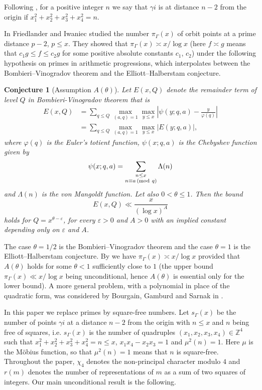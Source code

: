 \documentclass[12pt]{amsart}
\newtheorem{conjecture}{Conjecture}
\theoremstyle{remark}
\newcommand{\Z}{\mathbb{Z}}
\renewcommand{\pmod}[1]{\mkern3mu(\mathrm{mod}\ #1)}
\begin{document}
Following \cite{MR2486486}, for a positive integer $n$ we say that $\gamma i$ is at distance $n-2$ from the origin if $x_1^2+x_2^2+x_3^2+x_4^2=n$.

In \cite{MR2486486} Friedlander and Iwaniec studied the number $\pi_\Gamma(x)$ of orbit points at a prime distance $p-2$, $p\le x$. 
They showed that $\pi_\Gamma(x)\asymp x/\log x$ (here $f\asymp g$ means that $c_1 g \le f \le c_2 g$ for some positive absolute constants $c_1$, $c_2$) under the following hypothesis on primes in arithmetic progressions, which interpolates between the Bombieri--Vinogradov theorem and the Elliott--Halberstam conjecture. 


\begin{conjecture}[Assumption $A(\theta)$]
    \label{conj}
    Let $E(x,Q)$ denote the remainder term of level $Q$ in Bombieri-Vinogradov theorem that is
	\[
        \begin{split}
            E(x, Q) &= \sum_{q \leq Q} \max_{(a,q)=1} \max_{y \leq x} \left|\psi(y;q,a)-\frac{y}{\varphi(q)}\right| \\
            &=  \sum_{q \leq Q} \max_{(a,q)=1} \max_{y \leq x} |E(y;q,a)|,
        \end{split}
	\]
	where $\varphi(q)$ is the Euler's totient function, $\psi(x;q,a)$ is the Chebyshev function given by
	\[
	    \psi(x;q,a) = \sum_{\substack{n \leq x \\ n \equiv a \pmod q}} \Lambda(n)
	\]
    and $\Lambda(n)$ is the von Mangoldt function. 
    Let also $0 < \theta \leq 1$. 
    Then the bound
    \begin{equation} \tag{$A(\theta)$}
        E(x,Q) \ll \frac{x}{(\log x)^A}
    \end{equation}
    holds for $Q=x^{\theta-\varepsilon}$, for every $\varepsilon >0$ and $A>0$ with an implied constant depending only on $\varepsilon$ and $A$.
\end{conjecture}

The case $\theta=1/2$ is the Bombieri--Vinogradov theorem and the case $\theta=1$ is the Elliott--Halberstam conjecture. 
By \cite{MR2486486} we have $\pi_\Gamma(x)\asymp x/\log x$ provided that $A(\theta)$ holds for some $\theta < 1$ sufficiently close to $1$ (the upper bound $\pi_\Gamma(x)\ll x/\log x$ being unconditional, hence $A(\theta)$ is essential only for the lower bound). 
A more general problem, with a polynomial in place of the quadratic form, was considered by Bourgain, Gamburd and Sarnak in \cite{MR2246331}.

In this paper we replace primes by square-free numbers. 
Let $s_\Gamma(x)$ be the number of points $\gamma i$ at a distance $n-2$ from the origin with $n \leq x$ and $n$ being free of squares, i.e. $s_{\Gamma}(x)$ is the number of quadruples $(x_1,x_2,x_3,x_4) \in \Z^4$ such that $x_1^2+x_2^2+x_3^2+x_4^2 = n \leq x$, $x_1x_4-x_2x_3=1$ and $\mu^2(n)=1$.
Here $\mu$ is the M\"obius function, so that $\mu^2(n)=1$ means that $n$ is square-free. Throughout the paper, $\chi_4$ denotes the non-principal character modulo $4$ and $r(m)$ denotes the number of representations of $m$ as a sum of two squares of integers. 
Our main unconditional result is the following.
\end{document}
